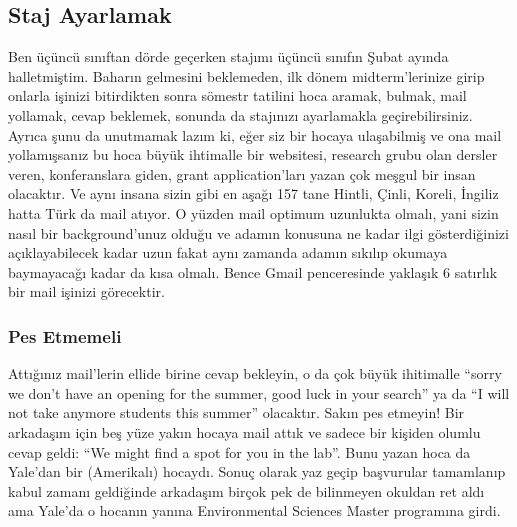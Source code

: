 \documentclass[12pt]{article}
\begin{document}
\subsection{Staj Ayarlamak}
Ben üçüncü sınıftan dörde geçerken stajımı üçüncü sınıfın Şubat ayında halletmiştim. Baharın gelmesini beklemeden, ilk dönem midterm’lerinize girip onlarla işinizi bitirdikten sonra sömestr tatilini hoca aramak, bulmak, mail yollamak, cevap beklemek, sonunda da stajınızı ayarlamakla geçirebilirsiniz. Ayrıca şunu da unutmamak lazım ki, eğer siz bir hocaya ulaşabilmiş ve ona mail yollamışsanız bu hoca büyük ihtimalle bir websitesi, research grubu olan dersler veren, konferanslara giden, grant application’ları yazan çok meşgul bir insan olacaktır. Ve aynı insana sizin gibi en aşağı 157 tane Hintli, Çinli, Koreli, İngiliz hatta Türk da mail atıyor. O yüzden mail optimum uzunlukta olmalı, yani sizin nasıl bir background’unuz olduğu ve adamın konusuna ne kadar ilgi gösterdiğinizi açıklayabilecek kadar uzun fakat aynı zamanda adamın sıkılıp okumaya baymayacağı kadar da kısa olmalı. Bence Gmail penceresinde yaklaşık 6 satırlık bir mail işinizi görecektir.


\subsubsection{Pes Etmemeli}
Attığınız mail’lerin ellide birine cevap bekleyin, o da çok büyük ihitimalle ``sorry we don’t have an opening for the summer, good luck in your search'' ya da ``I will not take anymore students this summer'' olacaktır. Sakın pes etmeyin! Bir arkadaşım için beş yüze yakın hocaya mail attık ve sadece bir kişiden olumlu cevap geldi: “We might find a spot for you in the lab''. Bunu yazan hoca da Yale’dan bir (Amerikalı) hocaydı. Sonuç olarak yaz geçip başvurular tamamlanıp kabul zamanı geldiğinde arkadaşım birçok pek de bilinmeyen okuldan ret aldı ama Yale’da o hocanın yanına Environmental Sciences Master programına girdi.
\end{document}
